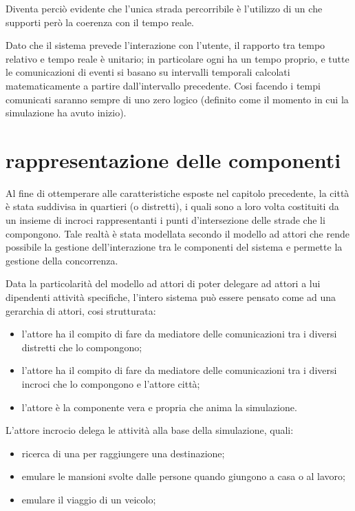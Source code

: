 Diventa perciò evidente che l'unica strada percorribile è l'utilizzo di un  che supporti però la coerenza con il tempo reale.

Dato che il sistema prevede l'interazione con l'utente, il rapporto tra tempo relativo e tempo reale è unitario; in particolare ogni  ha un tempo proprio, e tutte le comunicazioni di eventi si basano su intervalli temporali calcolati matematicamente a partire dall'intervallo precedente. Cosi facendo i tempi comunicati saranno sempre  di uno zero logico (definito come il momento in cui la simulazione ha avuto inizio).

\section*{rappresentazione delle componenti}
\label{analisi-della-soluzione-rappresentazione-delle-componenti}
Al fine di ottemperare alle caratteristiche esposte nel capitolo precedente, la città è stata suddivisa in quartieri (o distretti), i quali sono a loro volta costituiti da un insieme di incroci rappresentanti i punti d'intersezione delle strade che li compongono. Tale realtà è stata modellata secondo il modello ad attori che rende possibile la gestione dell'interazione tra le componenti del sistema e permette la gestione della concorrenza.

Data la particolarità del modello ad attori di poter delegare ad attori a lui dipendenti attività specifiche, l'intero sistema può essere pensato come ad una gerarchia di attori, cosi strutturata:

\begin{itemize}
\item{l'attore  ha il compito di fare da mediatore delle comunicazioni tra i diversi distretti che lo compongono;}
\item{l'attore  ha il compito di fare da mediatore delle comunicazioni tra i diversi incroci che lo compongono e l'attore città;}
\item{l'attore  è la componente vera e propria che anima la simulazione.}
\end{itemize}

L'attore incrocio delega le attività alla base della simulazione, quali:

\begin{itemize}
\item{ricerca di una  per raggiungere una destinazione;}
\item{emulare le mansioni svolte dalle persone quando giungono a casa o al lavoro;}
\item{emulare il viaggio di un veicolo;}
\end{itemize}

